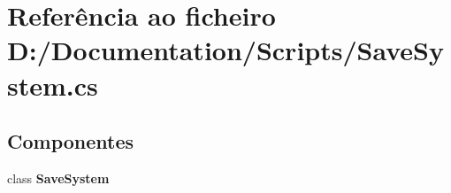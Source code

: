 \section{Referência ao ficheiro D\+:/\+Documentation/\+Scripts/\+Save\+System.cs}
\label{_save_system_8cs}
\subsection*{Componentes}
\begin{DoxyCompactItemize}
\item 
class {\bfseries Save\+System}
\end{DoxyCompactItemize}
